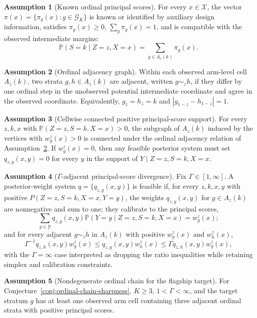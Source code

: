 \documentclass[11pt]{article}
\renewcommand{\Pr}{\mathbb{P}}
\theoremstyle{definition}
\newtheorem{assumption}{Assumption}
\theoremstyle{plain}
\theoremstyle{remark}
\begin{document}
\begin{assumption}[Known ordinal principal scores]\label{ass:principal-scores}
For every \(x\in\mathcal X\), the vector \(\pi(x)=\{\pi_g(x):g\in\mathcal G_K\}\) is known or identified by auxiliary design information, satisfies \(\pi_g(x)\ge0\), \(\sum_g\pi_g(x)=1\), and is compatible with the observed intermediate margins:
\[
  \Pr(S=k\mid Z=z,X=x)=\sum_{g\in A_z(k)}\pi_g(x).
\]
\end{assumption}

\begin{assumption}[Ordinal adjacency graph]\label{ass:adjacency}
Within each observed arm-level cell \(A_z(k)\), two strata \(g,h\in A_z(k)\) are adjacent, written \(g\sim_z h\), if they differ by one ordinal step in the unobserved potential intermediate coordinate and agree in the observed coordinate.  Equivalently, \(g_z=h_z=k\) and \(|g_{1-z}-h_{1-z}|=1\).
\end{assumption}

\begin{assumption}[Cellwise connected positive principal-score support]\label{ass:connected-support}
For every \(z,k,x\) with \(\Pr(Z=z,S=k,X=x)>0\), the subgraph of \(A_z(k)\) induced by the vertices with \(w^z_g(x)>0\) is connected under the ordinal adjacency relation of Assumption~\ref{ass:adjacency}.  If \(w^z_g(x)=0\), then any feasible posterior system must set \(q_{z,g}(x,y)=0\) for every \(y\) in the support of \(Y\mid Z=z,S=k,X=x\).
\end{assumption}

\begin{assumption}[\(\Gamma\)-adjacent principal-score divergence]\label{ass:divergence}
Fix \(\Gamma\in[1,\infty]\).  A posterior-weight system \(q=\{q_{z,g}(x,y)\}\) is feasible if, for every \(z,k,x,y\) with positive \(P(Z=z,S=k,X=x,Y=y)\), the weights \(q_{z,g}(x,y)\) for \(g\in A_z(k)\) are nonnegative and sum to one; they calibrate to the principal scores,
\[
  \sum_{y\in\mathcal Y} q_{z,g}(x,y)\Pr(Y=y\mid Z=z,S=k,X=x)=w^z_g(x);
\]
and for every adjacent \(g\sim_z h\) in \(A_z(k)\) with positive \(w^z_g(x)\) and \(w^z_h(x)\),
\[
  \Gamma^{-1}q_{z,h}(x,y)w^z_g(x)
  \le
  q_{z,g}(x,y)w^z_h(x)
  \le
  \Gamma q_{z,h}(x,y)w^z_g(x),
\]
with the \(\Gamma=\infty\) case interpreted as dropping the ratio inequalities while retaining simplex and calibration constraints.
\end{assumption}

\begin{assumption}[Nondegenerate ordinal chain for the flagship target]\label{ass:nondegenerate-chain}
For Conjecture~\ref{conj:ordinal-chain-sharpness}, \(K\ge3\), \(1<\Gamma<\infty\), and the target stratum \(g\) has at least one observed arm cell containing three adjacent ordinal strata with positive principal scores.
\end{assumption}
\end{document}

